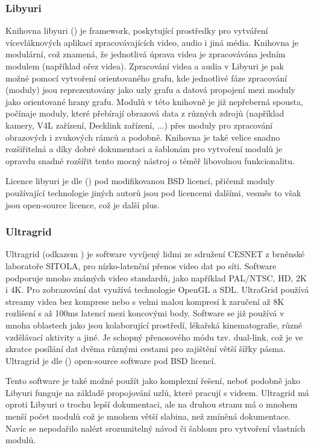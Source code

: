 \documentclass[thesis=M,czech]{FITthesis}[2012/06/26]
\begin{document}
\subsubsection{Libyuri} \label{subsubsec:analyza_reseni_yuri}
Knihovna libyuri (\cite{yuri}) je framework, poskytující prostředky pro vytváření vícevláknových aplikací zpracovávajících video, audio i jiná média. Knihovna je modulární, což znamená, že jednotlivá úprava videa je zpracovávána jedním modulem (například ořez videa). Zpracování videa a audia v Libyuri je pak možné pomocí vytvoření orientovaného grafu, kde jednotlivé fáze zpracování (moduly) jsou reprezentovány jako uzly grafu a datová propojení mezi moduly jako orientované hrany grafu. Modulů v této knihovně je již nepřeberná spousta, počínaje moduly, které přebírají obrazová data z různých zdrojů (například kamery, V4L zařízení, Decklink zařízení, ...) přes moduly pro zpracování obrazových i zvukových rámců a podobně. Knihovna je také velice snadno rozšiřitelná a díky dobré dokumentaci a šablonám pro vytvoření modulů je opravdu snadné rozšířit tento mocný nástroj o téměř libovolnou funkcionalitu.

	Licence libyuri je dle (\cite{yuri}) pod modifikovanou BSD licencí, přičemž moduly používající technologie jiných autorů jsou pod licencemi dalšími, vesměs to však jsou open-source licence, což je další plus.

\subsubsection{Ultragrid} \label{subsubsec:analyza_reseni_ultragrid}
Ultragrid (odkazem \cite{ultragrid_web}) je software vyvíjený lidmi ze sdružení CESNET z brněnské laboratoře SITOLA, pro nízko-latenční přenos video dat po síti. Software podporuje mnoho známých video standardů, jako například PAL/NTSC, HD, 2K i 4K. Pro zobrazování dat využívá technologie OpenGL a SDL. UltraGrid používá streamy videa bez komprese nebo s velmi malou kompresí k zaručení až 8K rozlišení s až 100ms latencí mezi koncovými body. Software se již používá v mnoha oblastech jako jsou kolaborující prostředí, lékařská kinematografie, různé vzdělávací aktivity a jiné. Je schopný přenosového módu tzv. dual-link, což je ve zkratce posílání dat dvěma různými cestami pro zajištění větší šířky pásma. Ultragrid je dle (\cite{ultragrid_wiki}) open-source software pod BSD licencí.
	
	Tento software je také možné použít jako komplexní řešení, neboť podobně jako Libyuri funguje na základě propojování uzlů, které pracují s videem. Ultragrid má oproti Libyuri o trochu lepší dokumentaci, ale na druhou stranu má o mnohem menší počet modulů což je mnohem větší slabina, než zmíněná dokumentace. Navíc se nepodařilo nalézt srozumitelný návod či šablonu pro vytvoření vlastních modulů.
\end{document}
